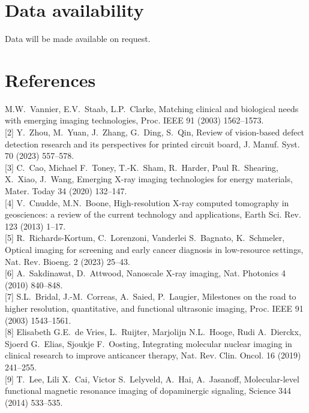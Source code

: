 \documentclass[11pt]{article}
\begin{document}
\section*{Data availability}

Data will be made available on request.

\section*{References}

\begin{footnotesize}
\noindent
[1] M.W.~Vannier, E.V.~Staab, L.P.~Clarke, Matching clinical and
biological needs with emerging imaging technologies, Proc. IEEE 91
(2003) 1562--1573.\\[2pt]
[2] Y.~Zhou, M.~Yuan, J.~Zhang, G.~Ding, S.~Qin, Review of
vision-based defect detection research and its perspectives for
printed circuit board, J. Manuf. Syst. 70 (2023) 557--578.\\[2pt]
[3] C.~Cao, Michael F.~Toney, T.-K.~Sham, R.~Harder, Paul R.~Shearing,
X.~Xiao, J.~Wang, Emerging X-ray imaging technologies for energy
materials, Mater. Today 34 (2020) 132--147.\\[2pt]
[4] V.~Cnudde, M.N.~Boone, High-resolution X-ray computed
tomography in geosciences: a review of the current technology and
applications, Earth Sci. Rev. 123 (2013) 1--17.\\[2pt]
[5] R.~Richards-Kortum, C.~Lorenzoni, Vanderlei S.~Bagnato,
K.~Schmeler, Optical imaging for screening and early cancer
diagnosis in low-resource settings, Nat. Rev. Bioeng. 2 (2023)
25--43.\\[2pt]
[6] A.~Sakdinawat, D.~Attwood, Nanoscale X-ray imaging, Nat.
Photonics 4 (2010) 840--848.\\[2pt]
[7] S.L.~Bridal, J.-M.~Correas, A.~Saied, P.~Laugier, Milestones
on the road to higher resolution, quantitative, and functional
ultrasonic imaging, Proc. IEEE 91 (2003) 1543--1561.\\[2pt]
[8] Elisabeth G.E.~de Vries, L.~Ruijter, Marjolijn N.L.~Hooge,
Rudi A.~Dierckx, Sjoerd G.~Elias, Sjoukje F.~Oosting, Integrating
molecular nuclear imaging in clinical research to improve
anticancer therapy, Nat. Rev. Clin. Oncol. 16 (2019) 241--255.\\[2pt]
[9] T.~Lee, Lili X.~Cai, Victor S.~Lelyveld, A.~Hai, A.~Jasanoff,
Molecular-level functional magnetic resonance imaging of
dopaminergic signaling, Science 344 (2014) 533--535.\\[2pt]

\end{footnotesize}
\end{document}
